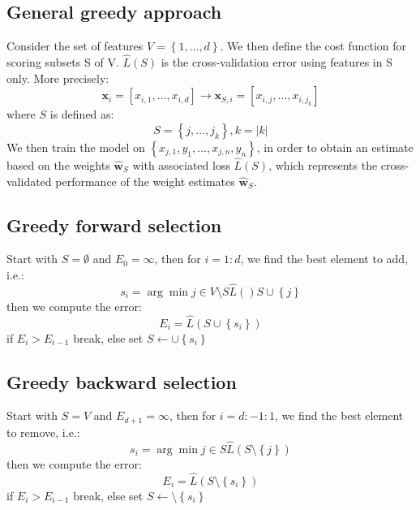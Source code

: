 \documentclass[a4paper,10pt,twoside]{article}
\begin{document}
\subsection{General greedy approach}
Consider the set of features $V=\left\{1,\ldots, d\right\}$. We then define the cost function for scoring subsets S of V. $\hat{L}(S)$ is the cross-validation error using features in S only. More precisely:
\begin{equation*}
    \mathbf{x}_i=[x_{i,1},\ldots,x_{i,d}]\rightarrow\mathbf{x}_{S,i}=[x_{i,j},\ldots,x_{i,j_k}]
\end{equation*}
where $S$ is defined as:
\begin{equation*}
    S=\left\{j,\ldots,j_{k}\right\}, k=|k|
\end{equation*}
We then train the model on $\left\{x_{j,1},y_1,\ldots,x_{j,n},y_n\right\}$, in order to obtain an estimate based on the weights $\hat{\mathbf{w}}_S$ with associated loss $\hat{L}(S)$, which represents the cross-validated performance of the weight estimates $\hat{\mathbf{w}}_S$.

\subsection{Greedy forward selection}
Start with $S=\emptyset$ and $E_0=\infty$, then for $i=1:d$, we find the best element to add, i.e.:
\begin{equation*}
    s_i=\arg\min{j\in V \setminus S}\hat{L}()S\cup \left\{j\right\}
\end{equation*}
then we compute the error:
\begin{equation*}
    E_i=\hat{L}(S\cup\left\{s_i\right\})
\end{equation*}
if $E_i>E_{i-1}$ break, else set $S\leftarrow \cup\left\{s_i\right\}$

\subsection{Greedy backward selection}
Start with $S=V$ and $E_{d+1}=\infty$, then for $i=d:-1:1$, we find the best element to remove, i.e.:
\begin{equation*}
    s_i=\arg\min{j\in S}\hat{L}(S\setminus\left\{j\right\})
\end{equation*}
then we compute the error:
\begin{equation*}
    E_i=\hat{L}(S\setminus\left\{s_i\right\})
\end{equation*}
if $E_i>E_{i-1}$ break, else set $S\leftarrow \setminus\left\{s_i\right\}$
\end{document}
